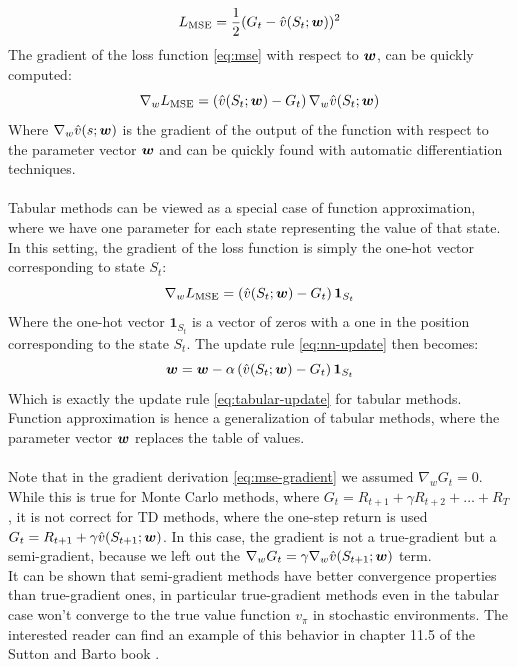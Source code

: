 \begin{equation}
    L_\textrm{MSE} = \frac{1}{2}(G_t - \hat{v}(S_t; \boldsymbol{w}))^2
    \label{eq:mse}
\end{equation}
The gradient of the loss function \eqref{eq:mse} with respect to $\boldsymbol{w}$, can be quickly computed:
\begin{equation}
    \nabla_{w} L_\mathrm{MSE} = \left( \hat{v}(S_t; \boldsymbol{w}) - G_t \right) \nabla_w \hat{v}(S_t; \boldsymbol{w})
    \label{eq:mse-gradient}
\end{equation}
Where $\nabla_w \hat{v}(s; \boldsymbol{w})$ is the gradient of the output of the function with respect to the parameter vector $\boldsymbol{w}$ and can be quickly found with automatic differentiation techniques.\\\\
Tabular methods can be viewed as a special case of function approximation, where we have one parameter for each state representing the value of that state. In this setting, the gradient of the loss function is simply the one-hot vector corresponding to state $S_t$:
\begin{equation}
    \nabla_w L_\mathrm{MSE} = \left( \hat{v}(S_t; \boldsymbol{w}) - G_t \right) \mathbf{1}_{S_t}
    \label{eq:tabular-mse-gradient}
\end{equation}
Where the one-hot vector $\mathbf{1}_{S_t}$ is a vector of zeros with a one in the position corresponding to the state $S_t$. The update rule \eqref{eq:nn-update} then becomes:
\begin{equation}
    \boldsymbol{w} = \boldsymbol{w} - \alpha \left( \hat{v}(S_t; \boldsymbol{w}) - G_t \right) \mathbf{1}_{S_t}
    \label{eq:approximation-tabular-update}
\end{equation}
Which is exactly the update rule \eqref{eq:tabular-update} for tabular methods. Function approximation is hence a generalization of tabular methods, where the parameter vector $\boldsymbol{w}$ replaces the table of values.\\\\
Note that in the gradient derivation \eqref{eq:mse-gradient} we assumed $\nabla_w G_t = 0$. While this is true for Monte Carlo methods, where $G_t = R_{t+1} + \gamma R_{t+2} + \dots + R_T$, it is not correct for TD methods, where the one-step return is used $G_t = R_{t+1} + \gamma \hat{v}(S_{t+1}; \boldsymbol{w})$. In this case, the gradient is not a true-gradient but a semi-gradient, because we left out the $\nabla_w G_t = \gamma \nabla_w \hat{v}(S_{t+1}; \boldsymbol{w})$ term.\\
It can be shown that semi-gradient methods have better convergence properties than true-gradient ones, in particular true-gradient methods even in the tabular case won't converge to the true value function $v_{\pi}$ in stochastic environments. The interested reader can find an example of this behavior in chapter 11.5 of the Sutton and Barto book \cite{sutton-barto}.

